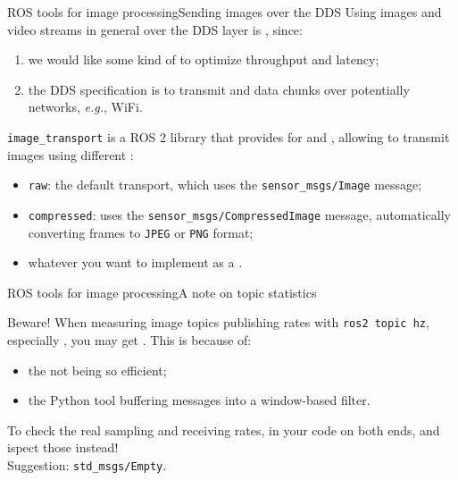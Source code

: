 \begin{frame}{ROS tools for image processing}{Sending images over the DDS}
  Using images and video streams in general over the DDS layer is , since:
  \begin{enumerate}
    \item we would like some kind of  to optimize throughput and latency;
    \item the DDS specification is  to transmit  and  data chunks over potentially  networks, \emph{e.g.}, WiFi.
  \end{enumerate}
  \texttt{image\_transport} is a ROS 2 library that provides  for  and , allowing to transmit images using different :
  \begin{itemize}
    \item \texttt{raw}: the default transport, which uses the \texttt{sensor\_msgs/Image} message;
    \item \texttt{compressed}: uses the \texttt{sensor\_msgs/CompressedImage} message, automatically converting frames to \texttt{JPEG} or \texttt{PNG} format;
    \item whatever you want to implement as a .
  \end{itemize}
\end{frame}
\begin{frame}{ROS tools for image processing}{A note on topic statistics}
  \begin{alertblock}{Beware!}
    When measuring image topics publishing rates with \texttt{ros2 topic hz}, especially , you may get . This is because of:
    \begin{itemize}
      \item the  not being so efficient;
      \item the  Python tool buffering messages into a window-based filter.
    \end{itemize}
    To check the real sampling and receiving rates,  in your code on both ends, and ispect those instead!\\
    Suggestion: \texttt{std\_msgs/Empty}.
  \end{alertblock}
\end{frame}
